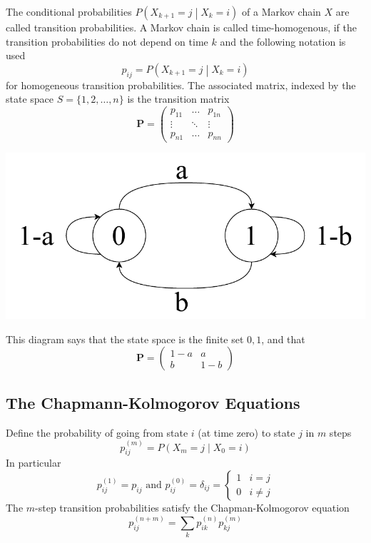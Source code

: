 \documentclass[11pt]{article}
\theoremstyle{definition}
\begin{document}
The conditional probabilities $P\left(X_{k+1}=j \middle| X_k = i\right)$ of a Markov chain $X$ are called transition probabilities. A Markov chain is called time-homogenous, if the transition probabilities do not depend on time $k$ and the following notation is used
\begin{equation*}
	p_{ij} = P\left(X_{k+1}=j\middle| X_k = i\right)
\end{equation*}
for homogeneous transition probabilities. The associated matrix, indexed by the state space $S = \{1,2,\dots,n\}$ is the transition matrix
\begin{equation*}
	\bm{P} = \begin{pmatrix}
	p_{11} & \dots & p_{1n}\\
	\vdots & \ddots & \vdots \\
	p_{n1} & \dots & p_{nn}
	\end{pmatrix}
\end{equation*}
\begin{center}
	\includegraphics[width=0.6\linewidth]{img/discrete_markov_chain}
\end{center}
This diagram says that the state space is the finite set ${0,1}$, and that
\begin{equation*}
	\bm{P} = \begin{pmatrix}
	1-a & a\\
	b & 1-b
	\end{pmatrix}
\end{equation*}
\subsection{The Chapmann-Kolmogorov Equations}
Define the probability of going from state $i$ (at time zero) to state $j$ in $m$ steps
\begin{equation*}
	p_{ij}^{(m)} = P\left( X_m = j \middle| X_0 = i \right)
\end{equation*}
In particular
\begin{equation*}
	p_{ij}^{(1)} = p_{ij}\text{ and } p_{ij}^{(0)} = \delta_{ij} = \left\{\begin{matrix}
	1 & i=j\\
	0 & i\neq j
	\end{matrix}
	\right.
\end{equation*}
The $m$-step transition probabilities satisfy the Chapman-Kolmogorov equation
\begin{equation*}
	p_{ij}^{(n+m)} = \sum_{k} p_{ik}^{(n)} p_{kj}^{(m)}
\end{equation*}
\end{document}
